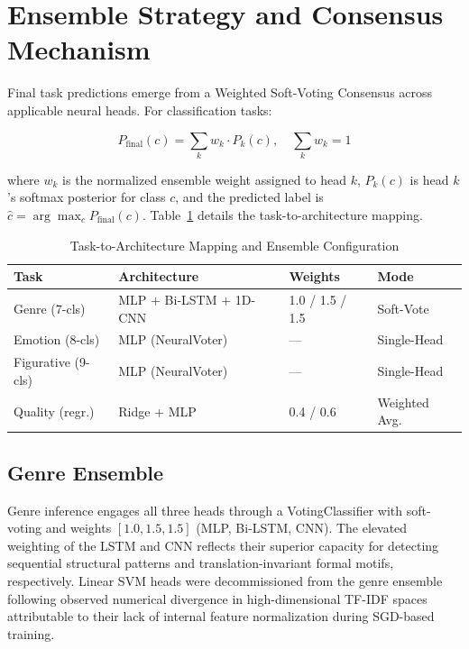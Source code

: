 \documentclass[conference]{IEEEtran}
\begin{document}
\section{Ensemble Strategy and Consensus Mechanism}
\label{sec:ensemble}

Final task predictions emerge from a Weighted Soft-Voting Consensus
across applicable neural heads. For classification tasks:

\begin{equation}
P_{\text{final}}(c) = \sum_k w_k \cdot P_k(c), \quad \sum_k w_k = 1
\end{equation}

where $w_k$ is the normalized ensemble weight assigned to head $k$,
$P_k(c)$ is head $k$'s softmax posterior for class $c$, and the
predicted label is $\hat{c} = \arg\max_c P_{\text{final}}(c)$.
Table~\ref{tab:ensemble} details the task-to-architecture mapping.

\begin{table}[htbp]
\caption{Task-to-Architecture Mapping and Ensemble Configuration}
\label{tab:ensemble}
\centering
\begin{tabular}{@{}llll@{}}
\toprule
\textbf{Task} & \textbf{Architecture} & \textbf{Weights} & \textbf{Mode} \\
\midrule
Genre (7-cls) & MLP + Bi-LSTM + 1D-CNN & 1.0 / 1.5 / 1.5 & Soft-Vote \\
Emotion (8-cls) & MLP (NeuralVoter) & --- & Single-Head \\
Figurative (9-cls) & MLP (NeuralVoter) & --- & Single-Head \\
Quality (regr.) & Ridge + MLP & 0.4 / 0.6 & Weighted Avg. \\
\bottomrule
\end{tabular}
\end{table}

\subsection{Genre Ensemble}

Genre inference engages all three heads through a VotingClassifier with
soft-voting and weights $[1.0, 1.5, 1.5]$ (MLP, Bi-LSTM, CNN). The
elevated weighting of the LSTM and CNN reflects their superior capacity
for detecting sequential structural patterns and translation-invariant
formal motifs, respectively. Linear SVM heads were decommissioned from
the genre ensemble following observed numerical divergence in
high-dimensional TF-IDF spaces attributable to their lack of internal
feature normalization during SGD-based training.
\end{document}
